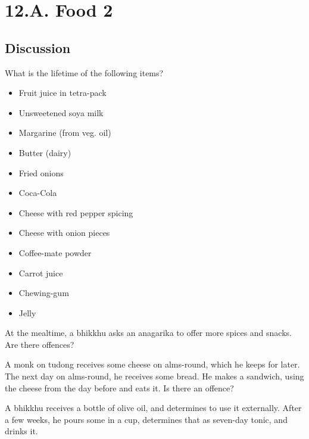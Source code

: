 \chapter{12.A. Food 2}
\renewcommand*{\theChapterTitle}{12.A. Food 2}

\section*{Discussion}

What is the lifetime of the following items?

\bigskip

\begin{multicols}{2}

\begin{itemize}

\item Fruit juice in tetra-pack
\item Unsweetened soya milk
\item Margarine (from veg. oil)
\item Butter (dairy)
\item Fried onions
\item Coca-Cola

\columnbreak

\item Cheese with red pepper spicing
\item Cheese with onion pieces
\item Coffee-mate powder
\item Carrot juice
\item Chewing-gum
\item Jelly

\end{itemize}

\end{multicols}

\bigskip

At the mealtime, a bhikkhu asks an anagarika to offer more spices and snacks.
Are there offences?

\bigskip

A monk on tudong receives some cheese on alms-round, which he keeps for later.
The next day on alms-round, he receives some bread. He makes a sandwich, using
the cheese from the day before and eats it. Is there an offence?

\bigskip

A bhikkhu receives a bottle of olive oil, and determines to use it externally.
After a few weeks, he pours some in a cup, determines that as seven-day tonic,
and drinks it.

